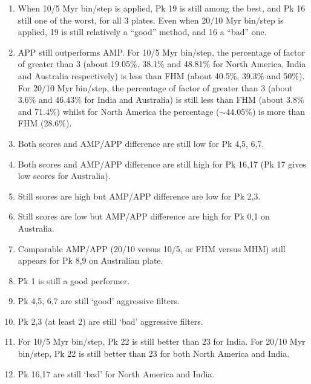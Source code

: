 \begin{enumerate}
  \item When 10/5 Myr bin/step is applied, Pk 19 is still among the best,
	and Pk 16 still one of the worst, for all 3 plates. Even when 20/10 Myr
	bin/step is applied, 19 is still relatively a ``good'' method, and 16 a
	``bad'' one.
  \item APP still outperforms AMP\@. For 10/5 Myr bin/step, the percentage of
	factor of greater than 3 (about 19.05\%, 38.1\% and 48.81\% for North
	America, India and Australia respectively) is less than FHM (about 40.5\%,
	39.3\% and 50\%). For 20/10 Myr bin/step, the percentage of factor of
	greater than 3 (about 3.6\% and 46.43\% for India and Australia) is still
	less than FHM (about 3.8\% and 71.4\%) whilst for North America the
	percentage (${\sim}44.05$\%) is more than FHM (28.6\%).
  \item Both scores and AMP/APP difference are still low for Pk 4,5, 6,7.
  \item Both scores and AMP/APP difference are still high for Pk 16,17
	(Pk 17 gives low scores for Australia).
  \item Still scores are high but AMP/APP difference are low for Pk 2,3.
  \item Still scores are low but AMP/APP difference are high for Pk 0,1 on
	Australia.
  \item Comparable AMP/APP (20/10 versus 10/5, or FHM versus MHM) still appears
        for Pk 8,9 on Australian plate.
  \item Pk 1 is still a good performer.
  \item Pk 4,5, 6,7 are still `good' aggressive filters.
  \item Pk 2,3 (at least 2) are still `bad' aggressive filters.
  \item For 10/5 Myr bin/step, Pk 22 is still better than 23 for India. For
	20/10 Myr bin/step, Pk 22 is still better than 23 for both North
	America and India.
  \item Pk 16,17 are still `bad' for North America and India.
\end{enumerate}

